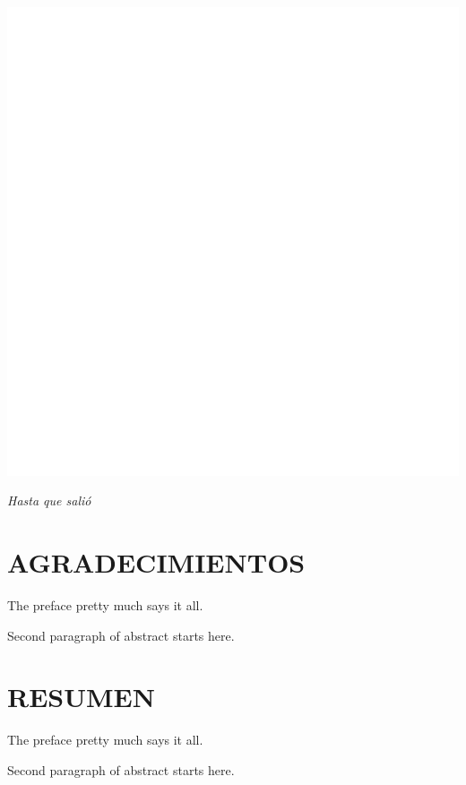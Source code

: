 \documentclass[10pt,twoside,letterpaper]{phstylee}
\begin{document}
\begin{flushright}
\large{\emph{}}
\end{flushright}
\begin{center}
\includegraphics{images/portada.pdf}
\end{center}



%
\begin{flushright}
\large{\emph{Hasta que salió}}
\end{flushright}
%
\cleardoublepage



\chapter*{AGRADECIMIENTOS}
The preface pretty much says it all.

Second paragraph of abstract starts here.
\cleardoublepage

\chapter*{RESUMEN}
The preface pretty much says it all.

Second paragraph of abstract starts here.
\cleardoublepage
\end{document}
